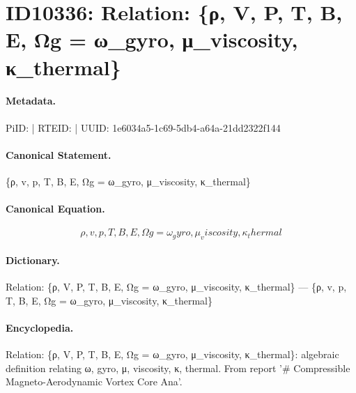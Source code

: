 \section*{ID10336: Relation: \{ρ, V, P, T, B, E, Ωg = ω\_gyro, μ\_viscosity, κ\_thermal\}}
\paragraph{Metadata.}
PiID:  | RTEID:  | UUID: 1e6034a5-1c69-5db4-a64a-21dd2322f144

\paragraph{Canonical Statement.}
\{ρ, v, p, T, B, E, Ωg = ω\_gyro, μ\_viscosity, κ\_thermal\}

\paragraph{Canonical Equation.}
\[
{ρ, v, p, T, B, E, Ωg = ω_gyro, μ_viscosity, κ_thermal}
\]

\paragraph{Dictionary.}
Relation: \{ρ, V, P, T, B, E, Ωg = ω\_gyro, μ\_viscosity, κ\_thermal\} — \{ρ, v, p, T, B, E, Ωg = ω\_gyro, μ\_viscosity, κ\_thermal\}

\paragraph{Encyclopedia.}
Relation: \{ρ, V, P, T, B, E, Ωg = ω\_gyro, μ\_viscosity, κ\_thermal\}: algebraic definition relating ω, gyro, μ, viscosity, κ, thermal. From report '\# Compressible Magneto-Aerodynamic Vortex Core Ana'.
